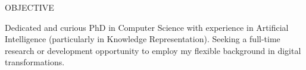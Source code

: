 %

\begin{rSection}{OBJECTIVE}

Dedicated and curious PhD in Computer Science with experience in Artificial Intelligence (particularly in Knowledge Representation). 
Seeking a full-time research or development opportunity to employ my flexible background in digital transformations.

\end{rSection}

